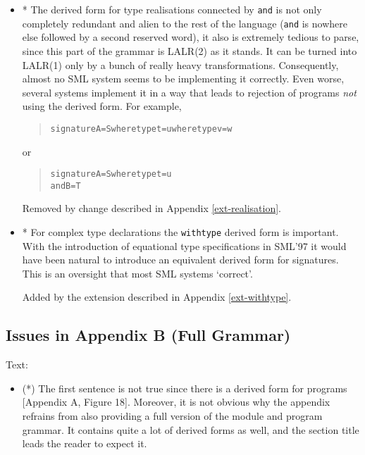\documentclass[twoside,titlepage]{article}
\begin{document}
\begin{appendix}
\begin{itemize}
\item * The derived form for type realisations connected by {\tt and} is not only completely redundant and alien to the rest of the language ({\tt and} is nowhere else followed by a second reserved word), it also is extremely tedious to parse, since this part of the grammar is LALR(2) as it stands. It can be turned into LALR(1) only by a bunch of really heavy transformations. Consequently, almost no SML system seems to be implementing it correctly. Even worse, several systems implement it in a way that leads to rejection of programs {\em not} using the derived form. For example,

\begin{quote}
\begin{alltt}
signature A = S where type t = u where type v = w
\end{alltt}
\end{quote}

or

\begin{quote}
\begin{alltt}
signature A = S where type t = u
and       B = T
\end{alltt}
\end{quote}

Removed by change described in Appendix \ref{ext-realisation}.

\item * For complex type declarations the {\tt withtype} derived form is important. With the introduction of equational type specifications in SML'97 it would have been natural to introduce an equivalent derived form for signatures. This is an oversight that most SML systems `correct'.

Added by the extension described in Appendix \ref{ext-withtype}.
\end{itemize}


\subsection{Issues in Appendix B (Full Grammar)}
\label{bugsappendixb}

Text:

\begin{itemize}
\item (*) The first sentence is not true since there is a derived form for programs [Appendix A, Figure 18]. Moreover, it is not obvious why the appendix refrains from also providing a full version of the module and program grammar. It contains quite a lot of derived forms as well, and the section title leads the reader to expect it.


\end{itemize}
\end{appendix}
\end{document}
